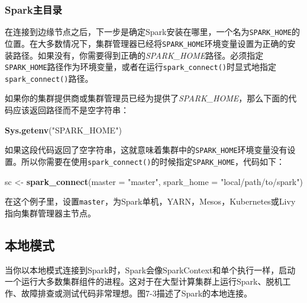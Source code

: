 \documentclass[
]{article}
\newenvironment{Shaded}{\begin{snugshade}}{\end{snugshade}}
\newcommand{\DataTypeTok}[1]{\textcolor[rgb]{0.13,0.29,0.53}{#1}}
\newcommand{\KeywordTok}[1]{\textcolor[rgb]{0.13,0.29,0.53}{\textbf{#1}}}
\newcommand{\NormalTok}[1]{#1}
\newcommand{\StringTok}[1]{\textcolor[rgb]{0.31,0.60,0.02}{#1}}
\begin{document}
\hypertarget{sparkux4e3bux76eeux5f55}{%
\subsubsection{Spark主目录}\label{sparkux4e3bux76eeux5f55}}

在连接到边缘节点之后，下一步是确定Spark安装在哪里，一个名为\texttt{SPARK\_HOME}的位置。在大多数情况下，集群管理器已经将\texttt{SPARK\_HOME}环境变量设置为正确的安装路径。如果没有，你需要得到正确的\emph{SPARK\_HOME}路径。必须指定\texttt{SPARK\_HOME}路径作为环境变量，或者在运行\texttt{spark\_connect()}时显式地指定\texttt{spark\_connect()}路径。

如果你的集群提供商或集群管理员已经为提供了\emph{SPARK\_HOME}，那么下面的代码应该返回路径而不是空字符串：

\begin{Shaded}
\begin{Highlighting}[]
\KeywordTok{Sys.getenv}\NormalTok{(}\StringTok{"SPARK_HOME"}\NormalTok{)}
\end{Highlighting}
\end{Shaded}

如果这段代码返回了空字符串，这就意味着集群中的\texttt{SPARK\_HOME}环境变量没有设置。所以你需要在使用\texttt{spark\_connect()}的时候指定\texttt{SPARK\_HOME}，代码如下：

\begin{Shaded}
\begin{Highlighting}[]
\NormalTok{sc <-}\StringTok{ }\KeywordTok{spark_connect}\NormalTok{(}\DataTypeTok{master =} \StringTok{"master"}\NormalTok{, }\DataTypeTok{spark_home =} \StringTok{"local/path/to/spark"}\NormalTok{)}
\end{Highlighting}
\end{Shaded}

在这个例子里，设置\texttt{master}，为Spark单机，YARN，Mesos，Kubernetes或Livy指向集群管理器主节点。

\hypertarget{ux672cux5730ux6a21ux5f0f}{%
\subsection{本地模式}\label{ux672cux5730ux6a21ux5f0f}}

当你以本地模式连接到Spark时，Spark会像SparkContext和单个执行一样，启动一个运行大多数集群组件的进程。这对于在大型计算集群上运行Spark、脱机工作、故障排查或测试代码非常理想。图7-3描述了Spark的本地连接。
\end{document}
